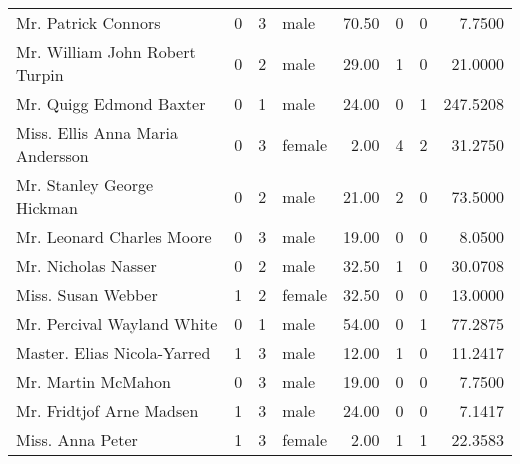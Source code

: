 \begin{tabular}{lrrlrrrr}
Mr. Patrick Connors                                &         0 &       3 &    male &  70.50 &                        0 &                        0 &    7.7500 \\
Mr. William John Robert Turpin                     &         0 &       2 &    male &  29.00 &                        1 &                        0 &   21.0000 \\
Mr. Quigg Edmond Baxter                            &         0 &       1 &    male &  24.00 &                        0 &                        1 &  247.5208 \\
Miss. Ellis Anna Maria Andersson                   &         0 &       3 &  female &   2.00 &                        4 &                        2 &   31.2750 \\
Mr. Stanley George Hickman                         &         0 &       2 &    male &  21.00 &                        2 &                        0 &   73.5000 \\
Mr. Leonard Charles Moore                          &         0 &       3 &    male &  19.00 &                        0 &                        0 &    8.0500 \\
Mr. Nicholas Nasser                                &         0 &       2 &    male &  32.50 &                        1 &                        0 &   30.0708 \\
Miss. Susan Webber                                 &         1 &       2 &  female &  32.50 &                        0 &                        0 &   13.0000 \\
Mr. Percival Wayland White                         &         0 &       1 &    male &  54.00 &                        0 &                        1 &   77.2875 \\
Master. Elias Nicola-Yarred                        &         1 &       3 &    male &  12.00 &                        1 &                        0 &   11.2417 \\
Mr. Martin McMahon                                 &         0 &       3 &    male &  19.00 &                        0 &                        0 &    7.7500 \\
Mr. Fridtjof Arne Madsen                           &         1 &       3 &    male &  24.00 &                        0 &                        0 &    7.1417 \\
Miss. Anna Peter                                   &         1 &       3 &  female &   2.00 &                        1 &                        1 &   22.3583 \\

\end{tabular}
